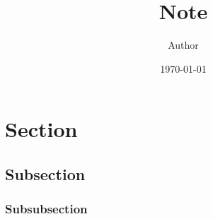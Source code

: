 \documentclass{note}
\title{Note}
\author{Author}
\date{\today}
\begin{document}
\maketitle
\newpage

\tableofcontents
\newpage

\section{Section}
\subsection{Subsection}
\subsubsection{Subsubsection}
\end{document}
